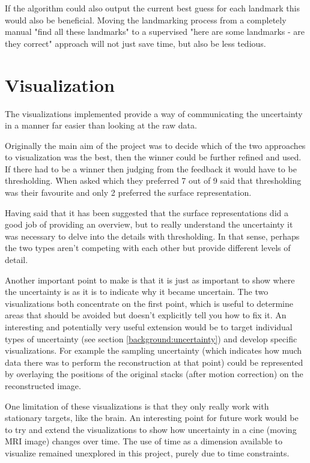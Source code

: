 If the algorithm could also output the current best guess for each landmark this would also be beneficial. Moving the landmarking process from a completely manual "find all these landmarks" to a supervised "here are some landmarks - are they correct" approach will not just save time, but also be less tedious.

\section{Visualization}
The visualizations implemented provide a way of communicating the uncertainty in a manner far easier than looking at the raw data.

Originally the main aim of the project was to decide which of the two approaches to visualization was the best, then the winner could be further refined and used. If there had to be a winner then judging from the feedback it would have to be thresholding. When asked which they preferred 7 out of 9 said that thresholding was their favourite and only 2 preferred the surface representation.

Having said that it has been suggested that the surface representations did a good job of providing an overview, but to really understand the uncertainty it was necessary to delve into the details with thresholding. In that sense, perhaps the two types aren't competing with each other but provide different levels of detail.

Another important point to make is that it is just as important to show where the uncertainty is as it is to indicate why it became uncertain. The two visualizations both concentrate on the first point, which is useful to determine areas that should be avoided but doesn't explicitly tell you how to fix it. An interesting and potentially very useful extension would be to target individual types of uncertainty (see section \ref{background:uncertainty}) and develop specific visualizations. For example the sampling uncertainty (which indicates how much data there was to perform the reconstruction at that point) could be represented by overlaying the positions of the original stacks (after motion correction) on the reconstructed image.

One limitation of these visualizations is that they only really work with stationary targets, like the brain. An interesting point for future work would be to try and extend the visualizations to show how uncertainty in a cine (moving MRI image) changes over time. The use of time as a dimension available to visualize remained unexplored in this project, purely due to time constraints.

